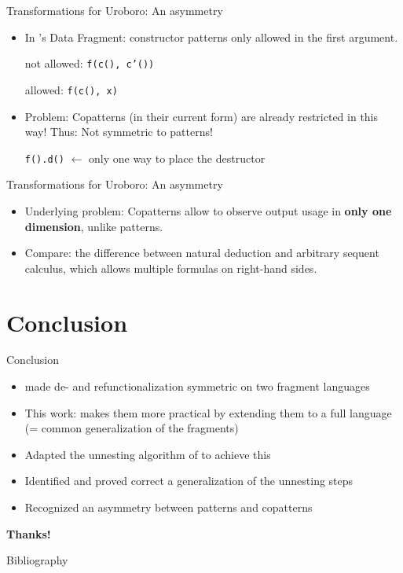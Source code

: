 \documentclass[xcolor=svgnames]{beamer}
\begin{document}

\begin{frame}
  {Transformations for Uroboro: An asymmetry}
  \begin{itemize}
    \item In \citeauthor{rendel15automatic}'s Data Fragment: constructor patterns only allowed in the first argument.

      not allowed: \texttt{f(c(), c'())}

      allowed: \texttt{f(c(), x)}

  \item Problem: Copatterns (in their current form) are already restricted in this way! Thus: Not symmetric to patterns!

      \texttt{f().d()} $\leftarrow$ only one way to place the destructor
  \end{itemize}
\end{frame}

\begin{frame}
  {Transformations for Uroboro: An asymmetry}
  \begin{itemize}
    \item Underlying problem: Copatterns allow to observe output usage in \textbf{only one dimension}, unlike patterns.

    \item Compare: the difference between natural deduction and arbitrary sequent calculus, which allows multiple formulas on right-hand sides.
  \end{itemize}
\end{frame}

\section{Conclusion}

\begin{frame}
  {Conclusion}
  \begin{itemize}
    \item \citet{rendel15automatic} made de- and refunctionalization symmetric on two fragment languages
    \item This work: makes them more practical by extending them to a full language (= common generalization of the fragments)
    \item Adapted the unnesting algorithm of \citet{setzer14unnesting} to achieve this
    \item Identified and proved correct a generalization of the unnesting steps
    \item Recognized an asymmetry between patterns and copatterns
  \end{itemize}

  \centering\textbf{Thanks!}
\end{frame}

\begin{frame}%
  {Bibliography}
  
  \tiny
\end{frame}
\end{document}
